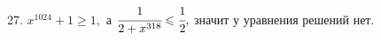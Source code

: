 27. $x^{1024}+1\geqslant1,$ а $\cfrac{1}{2+x^{318}}\leqslant\cfrac{1}{2},$ значит у уравнения решений нет.\\
